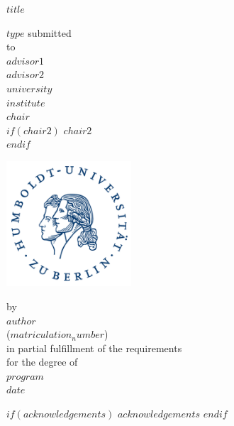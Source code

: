\documentclass[a4paper,11pt]{article}
\begin{document}
\thispagestyle{empty}
\begin{center}
  {\Large{\bf $title$}} \vspace{0.5cm}

  $type$ submitted \\\vspace{0.5cm}
  to \\\vspace{0.5cm}
  \textbf{$advisor1$} \\
  \textbf{$advisor2$} \\\vspace{0.5cm}
  $university$ \\
  $institute$ \\
  $chair$ \\
  $if(chair2)$ $chair2$ \\ $endif$ \vspace{1cm}

  \includegraphics[width=0.35\textwidth]{HU_Logo_small.png}
  
  by \\\vspace{0.5cm}
  \textbf{$author$} \\
  ($matriculation_number$) \\
  
  \medskip
  \medskip
  in partial fulfillment of the requirements \\
  for the degree of \\
  \textbf{$program$} \\\vspace{0.5cm}
  $date$
  
\end{center}

$if(acknowledgements)$
\newpage
$acknowledgements$
$endif$
\pagestyle{plain}
\setcounter{page}{1}    %
\end{document}

